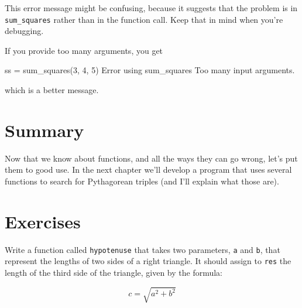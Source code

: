 This error message might be confusing, because it suggests that
the problem is in \verb"sum_squares" rather than in the function call.
Keep that in mind when you're debugging.

If you provide too many arguments, you get

\begin{code}
ss = sum_squares(3, 4, 5)
Error using sum_squares
Too many input arguments.
\end{code}

which is a better message.

\section{Summary}

Now that we know about functions, and all the ways they can go wrong, let's put them to good use.  In the next chapter we'll develop a program that uses several functions to search for Pythagorean triples (and I'll explain what those are).


\section{Exercises}

\begin{ex}
Write a function called {\tt hypotenuse} that takes two parameters, {\tt a} and {\tt b}, that represent the lengths of two sides of a right triangle.  It should assign to {\tt res} the length of the third side of the triangle, given by the formula:

\[ c = \sqrt{a^2 + b^2} \]
\end{ex}
